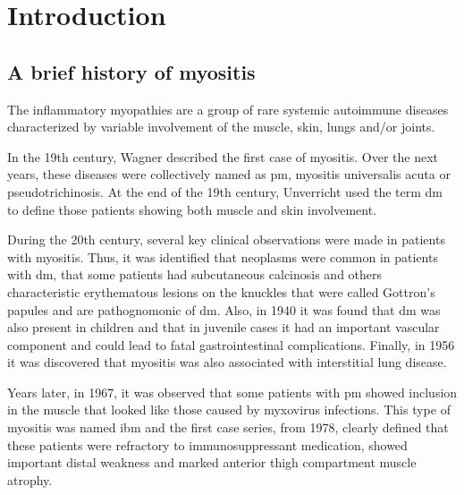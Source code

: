\chapter{Introduction}

\section{A brief history of myositis}

The inflammatory myopathies are a group of rare systemic autoimmune diseases characterized by variable involvement of the muscle, skin, lungs and/or joints.\cite{SelvaOCallaghan2018}

In the 19th century, Wagner described the first case of myositis.\cite{Wagner1863} Over the next years, these diseases were collectively named as \gls{pm}, myositis universalis acuta or pseudotrichinosis.\cite{Pottain1875,Hepp1887,Unverricht1887,Stertz1916,Kankeleit1916,Patjes1926,Hautveränderungen1930} At the end of the 19th century, Unverricht used the term \gls{dm} to define those patients showing both muscle and skin involvement.\cite{Unverricht1891}

During the 20th century, several key clinical observations were made in patients with myositis. Thus, it was identified that neoplasms were common in patients with \gls{dm}, that some patients had subcutaneous calcinosis and others characteristic erythematous lesions on the knuckles that were called Gottron’s papules and are pathognomonic of \gls{dm}.\cite{Stertz1916,Kankeleit1916,Patjes1926,Hautveränderungen1930} Also, in 1940 it was found that \gls{dm} was also present in children and that in juvenile cases it had an important vascular component and could lead to fatal gastrointestinal complications.\cite{Hecht1940} Finally, in 1956 it was discovered that myositis was also associated with interstitial lung disease.\cite{Mills1956}

Years later, in 1967, it was observed that some patients with \gls{pm} showed inclusion in the muscle that looked like those caused by myxovirus infections.\cite{Chou1967} This type of myositis was named \gls{ibm} and the first case series, from 1978, clearly defined that these patients were refractory to immunosuppressant medication, showed important distal weakness and marked anterior thigh compartment muscle atrophy.\cite{Carpenter1978}

